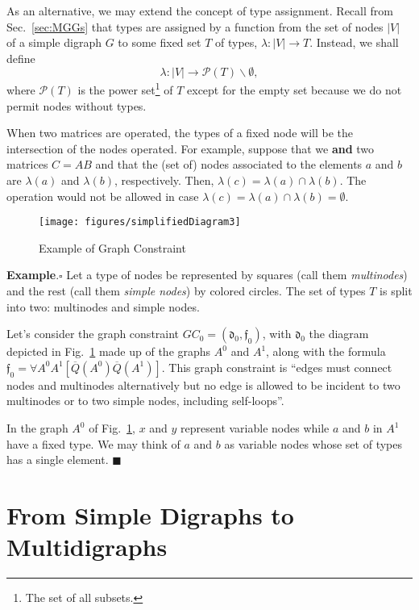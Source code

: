 \documentclass{fundam}
\newcommand{\proofend}{\hfill$\blacksquare$}
\begin{document}
As an alternative, we may extend the concept of type
assignment. Recall from Sec.~\ref{sec:MGGs} that types are assigned by
a function from the set of nodes $|V|$ of a simple digraph $G$ to some
fixed set $T$ of types, $\lambda:|V| \to T$. Instead, we shall define
\begin{equation}
  \label{eq:10}
  \lambda:|V| \longrightarrow \mathcal{P}(T)\backslash\emptyset,
\end{equation}
where $\mathcal{P}(T)$ is the power set\footnote{The set of all
  subsets.} of $T$ except for the empty set because we do not permit
nodes without types.

When two matrices are operated, the types of a fixed node will be the
intersection of the nodes operated. For example, suppose that we
\textbf{and} two matrices $C = AB$ and that the (set of) nodes
associated to the elements $a$ and $b$ are $\lambda(a)$ and
$\lambda(b)$, respectively. Then, $\lambda(c) = \lambda(a) \cap
\lambda(b)$. The operation would not be allowed in case $\lambda(c) =
\lambda(a) \cap \lambda(b) = \emptyset$. 

\begin{figure}[htbp]
  \centering
  \texttt{[image: figures/simplifiedDiagram3]}
  \caption{Example of Graph Constraint}
  \label{fig:simplifiedDiagram2}
\end{figure}

\noindent \textbf{Example}.$\square$ Let a type of nodes be
represented by squares (call them \emph{multinodes}) and the rest
(call them \emph{simple nodes}) by colored circles. The set of types
$T$ is split into two: multinodes and simple nodes.

Let's consider the graph constraint $GC_0 = \left( \mathfrak{d}_0,
  \mathfrak{f}_0 \right)$, with $\mathfrak{d}_0$ the diagram depicted
in Fig.~\ref{fig:simplifiedDiagram2} made up of the graphs $A^0$ and
$A^1$, along with the formula $\mathfrak{f}_0 = \forall A^0 A^1[
\overline{Q}(A^0) \overline{Q}(A^1)]$. This graph constraint is
``edges must connect nodes and multinodes alternatively but no edge
is allowed to be incident to two multinodes or to two simple nodes,
including self-loops''.

In the graph $A^0$ of Fig.~\ref{fig:simplifiedDiagram2}, $x$ and $y$
represent variable nodes while $a$ and $b$ in $A^1$ have a fixed
type. We may think of $a$ and $b$ as variable nodes whose set of types
has a single element. \proofend




\section{From Simple Digraphs to Multidigraphs}
\label{sec:fromSimpleDigraphsToMultidigraphs}
\end{document}
